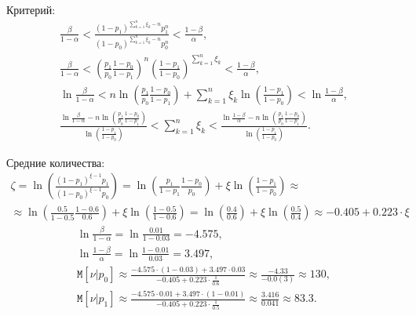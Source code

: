\documentclass[a4paper,12pt]{article}
\newcommand{\cexpectation}[2]{\texttt{M} \left[ #1 | #2 \right]}
\begin{document}
\begin{enumerate}
            Критерий:
            \begin{gather*}
                  \frac{\beta}{1 - \alpha} < \frac{(1-p_1)^{\sum_{k=1}^n \xi_k - n} p_1^n}{(1-p_0)^{\sum_{k=1}^n \xi_k - n} p_0^n} < \frac{1 - \beta}{\alpha} , \\
                  \frac{\beta}{1 - \alpha} < \left( \frac{p_1}{p_0} \frac{1-p_0}{1-p_1} \right)^n \left( \frac{1-p_1}{1-p_0} \right)^{\sum_{k=1}^n \xi_k} < \frac{1 - \beta}{\alpha} , \\
                  \ln \frac{\beta}{1 - \alpha} < n \ln \left( \frac{p_1}{p_0} \frac{1-p_0}{1-p_1} \right) + \sum_{k=1}^n \xi_k \ln \left( \frac{1-p_1}{1-p_0} \right) < \ln \frac{1 - \beta}{\alpha} , \\
                  \frac{\ln \frac{\beta}{1 - \alpha} - n \ln \left( \frac{p_1}{p_0} \frac{1-p_0}{1-p_1} \right)}{\ln \left( \frac{1-p_1}{1-p_0} \right)} <  \sum_{k=1}^n \xi_k < \frac{\ln \frac{1 - \beta}{\alpha} - n \ln \left( \frac{p_1}{p_0} \frac{1-p_0}{1-p_1} \right)}{\ln \left( \frac{1-p_1}{1-p_0} \right)} .
            \end{gather*}

            Средние количества:
            \begin{multline*}
                  \zeta
                  = \ln \left( \frac{(1-p_1)^{\xi-1} p_1}{(1-p_0)^{\xi-1} p_0} \right)
                  = \ln \left( \frac{p_1}{1-p_1} \frac{1-p_0}{p_0} \right) + \xi \ln \left( \frac{1-p_1}{1-p_0} \right) \approx \\
                  \approx \ln \left( \frac{0.5}{1-0.5} \frac{1-0.6}{0.6} \right) + \xi \ln \left( \frac{1-0.5}{1-0.6} \right)
                  = \ln \left( \frac{0.4}{0.6} \right) + \xi \ln \left( \frac{0.5}{0.4} \right)
                  \approx -0.405 + 0.223 \cdot \xi
            \end{multline*}
            \begin{gather*}
                  \ln \frac{\beta}{1-\alpha} = \ln \frac{0.01}{1-0.03} = -4.575 , \\
                  \ln \frac{1-\beta}{\alpha} = \ln \frac{1-0.01}{0.03} = 3.497 , \\
                  \cexpectation{\nu}{p_0}
                  \approx \frac{-4.575 \cdot (1-0.03) + 3.497 \cdot 0.03}{-0.405 + 0.223 \cdot \frac{1}{0.6}}
                  \approx \frac{-4.33}{-0.0(3)}
                  \approx 130 , \\
                  \cexpectation{\nu}{p_1}
                  \approx \frac{-4.575 \cdot 0.01 + 3.497 \cdot (1-0.01)}{-0.405 + 0.223 \cdot \frac{1}{0.5}}
                  \approx \frac{3.416}{0.041}
                  \approx 83.3 .
            \end{gather*}


\end{enumerate}
\end{document}
